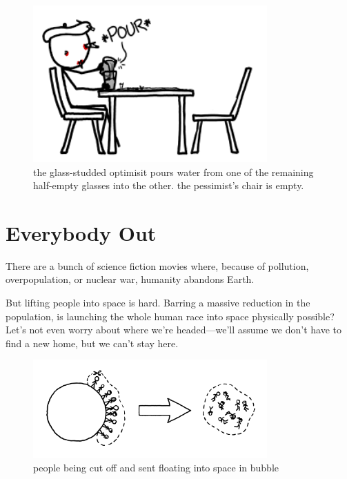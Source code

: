 \begin{figure}[!htbp]
\centering
\includegraphics[scale=0.5, max width=0.8\textwidth]{imgs/a/6/glass_end.png}
\caption{the glass-studded optimisit pours water from one of the remaining half-empty glasses into the other. the pessimist's chair is empty.}
\end{figure}

{
\chapter{Everybody Out}
}

\hfill{}

{There are a bunch of science fiction movies where, because of pollution, overpopulation, or nuclear war, humanity abandons Earth.}

{But lifting people into space is hard. Barring a massive reduction in the population, is launching the whole human race into space physically possible? Let’s not even worry about where we’re headed—we’ll assume we don’t have to find a new home, but we can’t stay here.}

\begin{figure}[!htbp]
\centering
\includegraphics[scale=0.5, max width=0.8\textwidth]{imgs/a/7/everybody_out_plan.png}
\caption{people being cut off and sent floating into space in bubble}
\end{figure}

